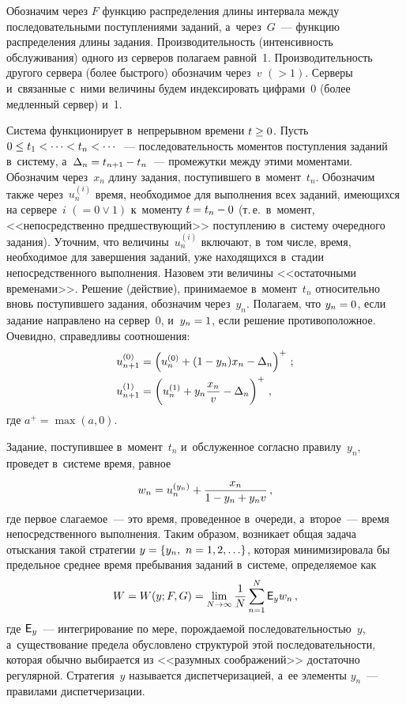 \begin{multicols}{2}
    Обозначим через $F$ функцию распределения длины интервала между 
последовательными поступлениями заданий, а~через~$G$~--- функцию распределения 
длины задания. Производительность (интенсивность обслуживания) одного из серверов 
полагаем равной~1. Производительность другого сервера (более быстрого) обозначим 
через~$v$ $(>1)$. Серверы и~связанные с~ними величины будем индексировать цифрами~0 
(более медленный сервер) и~1.
    
    Система функционирует в~непрерывном времени $t\hm\geq 0$. Пусть $0\hm\leq 
t_1<\cdots < t_n\hm<\cdots$~--- последовательность моментов поступления заданий в~систему, 
а~$\Delta_n \hm= t_{n+1}\hm- t_n$~--- промежутки между этими моментами. Обозначим 
через~$x_n$ длину задания, поступившего в~момент~$t_n$. Обозначим также 
через~$u_n^{(i)}$ время, необходимое для выполнения всех заданий, имеющихся на 
сервере~$i$ $(=0\vee1)$ к~моменту $t \hm= t_n\hm-0$ (т.\,е.\ в~момент, <<непосредственно 
пред\-шест\-ву\-ющий>> поступлению в~систему очередного задания). Уточним, что 
величины~$u_n^{(i)}$ включают, в~том числе, время, необходимое для завершения 
заданий, уже находящихся в~стадии непосредственного выполнения. Назовем эти 
величины <<остаточными временами>>. Решение (действие), при\-ни\-ма\-емое 
в~момент~$t_n$ относительно вновь поступившего задания, обозначим через~$y_n$. 
Полагаем, что $y_n\hm=0$, если задание направлено на сервер~0, и~$y_n\hm=1$, если 
решение противоположное. Очевидно, справедливы соотношения:
    \begin{align*}
    u_{n+1}^{(0)} &= \left( u_n^{(0)} +(1-y_n) x_n-\Delta_n\right)^+\,;\\
    u_{n+1}^{(1)} &= \left( u_n^{(1)} +y_n \displaystyle\frac{\displaystyle x_n\mathstrut}{\displaystyle v\mathstrut}-\Delta_n\right)^+\,,
    \end{align*}
где $a^+=\max (a,0)$.
    
    Задание, поступившее в~момент~$t_n$ и~обслуженное согласно правилу~$y_n$, 
проведет в~системе время, равное
    $$
    w_n= u_n^{(y_n)} +\displaystyle\frac{\displaystyle x_n\mathstrut}{\displaystyle 1-y_n+y_n v\mathstrut}\,,
    $$
где первое слагаемое~--- это время, проведенное в~очереди, а~второе~--- время 
непосредственного выполнения. Таким образом, возникает общая задача отыскания такой 
стратегии $y\hm= \{y_n,\ n\hm=1,2,\ldots\}$, которая минимизировала бы предельное 
среднее время пребывания заданий в~системе, опре\-де\-ля\-емое как
$$
W= W(y;F,G) =\lim\limits_{N\to\infty} \displaystyle\frac{\displaystyle 1\mathstrut}{\displaystyle N\mathstrut}\sum\limits_{n=1}^N {\sf E}_y w_n\,,
$$
где ${\sf E}_y$~--- интегрирование по мере, порождаемой последовательностью~$y$, 
а~существование предела обусловлено структурой этой последовательности, которая 
обычно выбирается из <<разумных соображений>> достаточно регулярной. 
Стратегия~$y$ называется диспетчеризацией, а~ее элементы $y_n$~--- правилами 
диспетчеризации.
    

\end{multicols}
